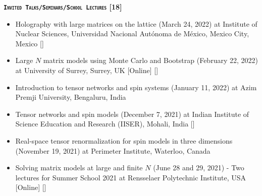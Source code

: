 \vspace{2mm} 
\textcolor{alizarin}{\textbf{\textsc{\fontsize{10}{38} \bfseries \texttt{Invited Talks/Seminars/School Lectures} [18]}}}

\begin{itemize}

 \item Holography with large matrices on the lattice (March 24, 2022) at Institute of Nuclear Sciences, 
 Universidad Nacional Aut\'{o}noma de M\'{e}xico, Mexico City, Mexico   
  [\texttt{\textbf{}}]
 \vspace{1mm}%
 
\item Large $N$ matrix models using Monte Carlo and Bootstrap
 (February 22, 2022) at University of Surrey, Surrey, UK [Online]  
 [\texttt{\textbf{}}]
 \vspace{1mm} 
 
 \item Introduction to tensor networks and spin systems 
 (January 11, 2022) at Azim Premji University, Bengaluru, India  \vspace{1mm} 
 
 \item Tensor networks and spin models 
 (December 7, 2021) at Indian Institute of Science Education and Research (IISER), Mohali, India 
 [\texttt{\textbf{}}]  \vspace{1mm} 
 
  \item Real-space tensor renormalization for spin models in three dimensions 
 (November 19, 2021) at Perimeter Institute, Waterloo, Canada \vspace{1mm}  
 
 \item Solving matrix models at large and finite $N$ (June 28 and 29, 2021) - Two lectures for 
Summer School 2021 at Rensselaer Polytechnic Institute, USA [Online]  
  [\texttt{\textbf{}}] \vspace{1mm} 
 

\end{itemize}
